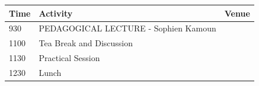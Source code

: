 \documentclass[12pt,]{book}
\begin{document}
\begin{longtable}[]{@{}lll@{}}
\toprule
\begin{minipage}[b]{0.09\columnwidth}\raggedright\strut
Time\strut
\end{minipage} & \begin{minipage}[b]{0.38\columnwidth}\raggedright\strut
Activity\strut
\end{minipage} & \begin{minipage}[b]{0.13\columnwidth}\raggedright\strut
Venue\strut
\end{minipage}\tabularnewline
\midrule
\endhead
\begin{minipage}[t]{0.09\columnwidth}\raggedright\strut
930\strut
\end{minipage} & \begin{minipage}[t]{0.38\columnwidth}\raggedright\strut
PEDAGOGICAL LECTURE - Sophien Kamoun\strut
\end{minipage} & \begin{minipage}[t]{0.13\columnwidth}\raggedright\strut
\strut
\end{minipage}\tabularnewline
\begin{minipage}[t]{0.09\columnwidth}\raggedright\strut
1100\strut
\end{minipage} & \begin{minipage}[t]{0.38\columnwidth}\raggedright\strut
Tea Break and Discussion\strut
\end{minipage} & \begin{minipage}[t]{0.13\columnwidth}\raggedright\strut
\strut
\end{minipage}\tabularnewline
\begin{minipage}[t]{0.09\columnwidth}\raggedright\strut
1130\strut
\end{minipage} & \begin{minipage}[t]{0.38\columnwidth}\raggedright\strut
Practical Session\strut
\end{minipage} & \begin{minipage}[t]{0.13\columnwidth}\raggedright\strut
\strut
\end{minipage}\tabularnewline
\begin{minipage}[t]{0.09\columnwidth}\raggedright\strut
1230\strut
\end{minipage} & \begin{minipage}[t]{0.38\columnwidth}\raggedright\strut
Lunch\strut
\end{minipage} & \begin{minipage}[t]{0.13\columnwidth}\raggedright\strut

\end{minipage}
\end{longtable}
\end{document}
